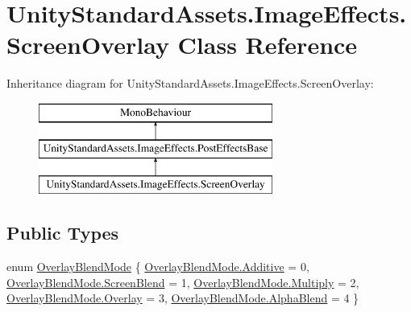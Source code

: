 \hypertarget{class_unity_standard_assets_1_1_image_effects_1_1_screen_overlay}{}\section{Unity\+Standard\+Assets.\+Image\+Effects.\+Screen\+Overlay Class Reference}
\label{class_unity_standard_assets_1_1_image_effects_1_1_screen_overlay}
Inheritance diagram for Unity\+Standard\+Assets.\+Image\+Effects.\+Screen\+Overlay\+:\begin{figure}[H]
\begin{center}
\leavevmode
\includegraphics[height=3.000000cm]{class_unity_standard_assets_1_1_image_effects_1_1_screen_overlay}
\end{center}
\end{figure}
\subsection*{Public Types}
\begin{DoxyCompactItemize}
\item 
enum \mbox{\hyperlink{class_unity_standard_assets_1_1_image_effects_1_1_screen_overlay_a30569b65d427b6bed92c74463682cb00}{Overlay\+Blend\+Mode}} \{ \newline
\mbox{\hyperlink{class_unity_standard_assets_1_1_image_effects_1_1_screen_overlay_a30569b65d427b6bed92c74463682cb00a3f7b3d8ee7bf0d542bd50821c083888f}{Overlay\+Blend\+Mode.\+Additive}} = 0, 
\mbox{\hyperlink{class_unity_standard_assets_1_1_image_effects_1_1_screen_overlay_a30569b65d427b6bed92c74463682cb00ac6f5f0994e6774e75e18f30dd2120dfe}{Overlay\+Blend\+Mode.\+Screen\+Blend}} = 1, 
\mbox{\hyperlink{class_unity_standard_assets_1_1_image_effects_1_1_screen_overlay_a30569b65d427b6bed92c74463682cb00ae257376d913f3b53cbb4a9b19d770648}{Overlay\+Blend\+Mode.\+Multiply}} = 2, 
\mbox{\hyperlink{class_unity_standard_assets_1_1_image_effects_1_1_screen_overlay_a30569b65d427b6bed92c74463682cb00a6b551379c3c0b59326abdaf3b4395bd3}{Overlay\+Blend\+Mode.\+Overlay}} = 3, 
\newline
\mbox{\hyperlink{class_unity_standard_assets_1_1_image_effects_1_1_screen_overlay_a30569b65d427b6bed92c74463682cb00aaacd89df7585eb749bfd3b129758148f}{Overlay\+Blend\+Mode.\+Alpha\+Blend}} = 4
 \}
\end{DoxyCompactItemize}

